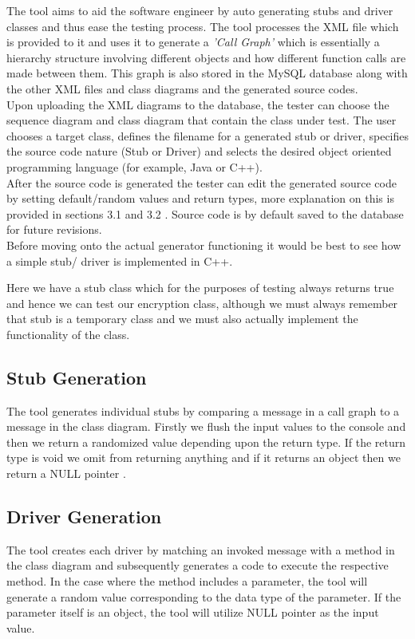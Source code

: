 \documentclass{article}
\begin{document}
The tool aims to aid the software engineer by auto generating stubs and driver classes \cite{diggaD} and thus ease the testing process. The tool processes the XML file which is provided to it and uses it to generate a \textit{'Call Graph'} which is essentially a hierarchy structure involving different objects and how different function calls are made between them. This graph is also stored in the MySQL database along with the other XML files and class diagrams and the generated source codes.\\

Upon uploading the XML diagrams to the database, the tester can choose the sequence diagram and class diagram that contain the class under test. The user chooses a target class, defines the filename for a generated stub or driver, specifies the source code nature (Stub or Driver) and selects the desired object oriented programming language (for example, Java or C++).\\

After the source code is generated the tester can edit the generated source code by setting default/random values and return types, more explanation on this is provided in sections 3.1 and 3.2 . Source code is by default saved to the database for future revisions.\\


Before moving onto the actual generator functioning it would be best to see how a simple stub/ driver is implemented in C++.

Here we have a stub class which for the purposes of testing always returns true and hence we can test our encryption class, although we must always remember that stub is a temporary class and we must also actually implement the functionality of the class.
\subsection{Stub Generation}
The tool generates individual stubs by comparing a message in a call graph to a message in the class diagram. Firstly we flush the input values to the console and then we return a randomized value depending upon the return type. If the return type is void we omit from returning anything and if it returns an object then we return a NULL pointer \cite{newnig}.

\subsection{Driver Generation}
The tool creates each driver by matching an invoked message with a method in the class diagram and subsequently generates a code to execute the respective method. In the case where the method includes a parameter, the tool will generate a random value corresponding to the data type of the parameter. If the parameter itself is an object, the tool will utilize NULL pointer as the input value.

\end{document}
